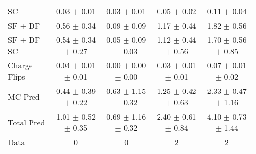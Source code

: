 \begin{tabular}{l|cccc}
                                 SC &  0.03 $\pm$  0.01 &  0.03 $\pm$  0.01 &  0.05 $\pm$  0.02 &  0.11 $\pm$  0.04 \\
                            SF + DF &  0.56 $\pm$  0.34 &  0.09 $\pm$  0.09 &  1.17 $\pm$  0.44 &  1.82 $\pm$  0.56 \\
\hline
                       SF + DF - SC &  0.54 $\pm$  0.34 $\pm$  0.27 &  0.05 $\pm$  0.09 $\pm$  0.03 &  1.12 $\pm$  0.44 $\pm$  0.56 &  1.70 $\pm$  0.56 $\pm$  0.85 \\
\hline\hline
                       Charge Flips &  0.04 $\pm$  0.01 $\pm$  0.01 &  0.00 $\pm$  0.00 $\pm$  0.00 &  0.03 $\pm$  0.01 $\pm$  0.01 &  0.07 $\pm$  0.01 $\pm$  0.02 \\
\hline
                            MC Pred &  0.44 $\pm$  0.39 $\pm$  0.22 &  0.63 $\pm$  1.15 $\pm$  0.32 &  1.25 $\pm$  0.42 $\pm$  0.63 &  2.33 $\pm$  0.47 $\pm$  1.16 \\
\hline
                         Total Pred &  1.01 $\pm$  0.52 $\pm$  0.35 &  0.69 $\pm$  1.16 $\pm$  0.32 &  2.40 $\pm$  0.61 $\pm$  0.84 &  4.10 $\pm$  0.73 $\pm$  1.44 \\
\hline\hline
                               Data &     0 &     0 &     2 &     2 \\
\hline\hline
\end{tabular}


